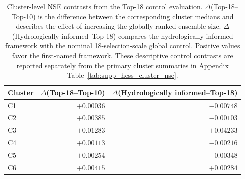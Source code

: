 \begin{table}[htbp]
\centering
\caption{Cluster-level NSE contrasts from the Top-18 control evaluation. $\Delta$(Top-18--Top-10) is the difference between the corresponding cluster medians and describes the effect of increasing the globally ranked ensemble size. $\Delta$(Hydrologically informed--Top-18) compares the hydrologically informed framework with the nominal 18-selection-scale global control. Positive values favor the first-named framework. These descriptive control contrasts are reported separately from the primary cluster summaries in Appendix Table~\ref{tab:supp_hess_cluster_nse}.}
\label{tab:supp_top18_clusters}
\small
\renewcommand{\arraystretch}{1.12}
\begin{tabular}{lrr}
\toprule
Cluster & $\Delta$(Top-18--Top-10) & $\Delta$(Hydrologically informed--Top-18) \\
\midrule
C1 & $+0.00036$ & $-0.00748$ \\
C2 & $+0.00385$ & $-0.00103$ \\
C3 & $+0.01283$ & $\mathbf{+0.04233}$ \\
C4 & $+0.00113$ & $-0.00216$ \\
C5 & $+0.00254$ & $-0.00348$ \\
C6 & $+0.00415$ & $+0.00284$ \\
\bottomrule
\end{tabular}
\end{table}

